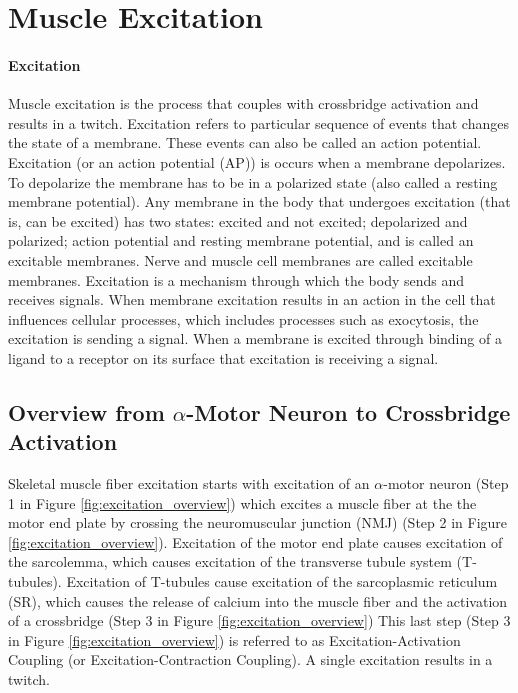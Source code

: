 \section{Muscle Excitation}
\paragraph{Excitation}
Muscle excitation is the process that couples with crossbridge activation and results in a twitch. Excitation refers to particular sequence of events that changes the state of a membrane. These events can also be called an action potential. Excitation (or an action potential (AP)) is occurs when a membrane depolarizes. To depolarize the membrane has to be in a polarized state (also called a resting membrane potential). Any membrane in the body that undergoes excitation (that is, can be excited) has two states: excited and not excited; depolarized and polarized; action potential and resting membrane potential, and is called an excitable membranes. Nerve and muscle cell membranes are called excitable membranes. Excitation is a mechanism through which the body sends and receives signals. When membrane excitation results in an action in the cell that influences cellular processes, which includes processes such as exocytosis,\footnotemark{} the excitation is sending a signal. When a membrane is excited through binding of a ligand\footnotemark{} to a receptor on its surface that excitation is receiving a signal. 

\subsection{Overview from $\alpha$-Motor Neuron to Crossbridge Activation}

Skeletal muscle fiber excitation starts with excitation of an $\alpha$-motor neuron (Step 1 in Figure \ref{fig:excitation_overview}) which excites a muscle fiber at the the motor end plate by crossing the neuromuscular junction (NMJ) (Step 2 in Figure \ref{fig:excitation_overview}). Excitation of the motor end plate causes excitation of the sarcolemma, which causes excitation of the transverse tubule system (T-tubules). Excitation of T-tubules cause excitation of the sarcoplasmic reticulum (SR), which causes the release of calcium into the muscle fiber and the activation of a crossbridge (Step 3 in Figure \ref{fig:excitation_overview}) This last step (Step 3 in Figure \ref{fig:excitation_overview}) is referred to as Excitation-Activation Coupling (or Excitation-Contraction Coupling). A single excitation results in a twitch.

